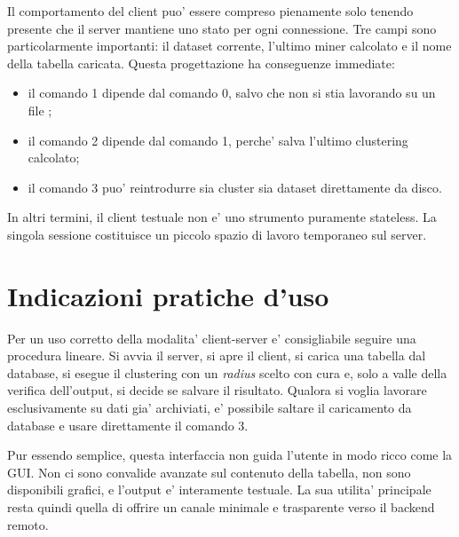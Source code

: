 Il comportamento del client puo' essere compreso pienamente solo tenendo presente che il
server mantiene uno stato per ogni connessione. Tre campi sono particolarmente
importanti: il dataset corrente, l'ultimo miner calcolato e il nome della tabella
caricata. Questa progettazione ha conseguenze immediate:

\begin{itemize}
  \item il comando 1 dipende dal comando 0, salvo che non si stia lavorando su un file
    ;
  \item il comando 2 dipende dal comando 1, perche' salva l'ultimo clustering calcolato;
  \item il comando 3 puo' reintrodurre sia cluster sia dataset direttamente da disco.
\end{itemize}

In altri termini, il client testuale non e' uno strumento puramente stateless. La singola
sessione costituisce un piccolo spazio di lavoro temporaneo sul server.

\section{Indicazioni pratiche d'uso}

Per un uso corretto della modalita' client-server e' consigliabile seguire una procedura
lineare. Si avvia il server, si apre il client, si carica una tabella dal database, si
esegue il clustering con un \emph{radius} scelto con cura e, solo a valle della verifica
dell'output, si decide se salvare il risultato. Qualora si voglia lavorare esclusivamente
su dati gia' archiviati, e' possibile saltare il caricamento da database e usare
direttamente il comando 3.

Pur essendo semplice, questa interfaccia non guida l'utente in modo ricco come la GUI.
Non ci sono convalide avanzate sul contenuto della tabella, non sono disponibili grafici,
e l'output e' interamente testuale. La sua utilita' principale resta quindi quella di
offrire un canale minimale e trasparente verso il backend remoto.
